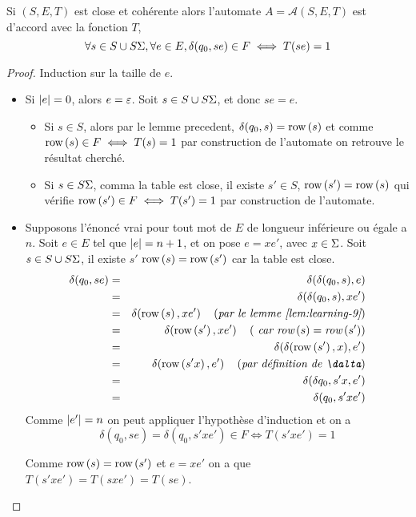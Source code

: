 \begin{lemma}
	Si $(S,E,T)$ est close et cohérente alors l'automate $A = \mathcal A (S,E,T)$
	est d'accord avec la fonction $T$, \ie
	$$\forall s \in S \cup S\Sigma, \forall e \in E, \delta(q_0,se) \in F \iff T(se) =1$$
\end{lemma}

\begin{proof}

	Induction sur la taille de $e$.

	\begin{itemize}
		\item Si $|e| = 0$, alors $e = \varepsilon$.
		      Soit $s \in S \cup S \Sigma$, et donc $se = e$.
		      \begin{itemize}
			      \item Si $s \in S$, alors par le lemme precedent,
			            $\delta(q_0, s) = \text{row}\left(s\right)$ et
			            comme $\text{row}\left(s\right) \in F \iff T(s) = 1$ par construction de l'automate on retrouve le résultat cherché.
			      \item Si $s \in S\Sigma$, comma la table est close, il existe $s' \in S$, \tq $\text{row}\left(s'\right) = \text{row}\left(s\right)$ qui vérifie
			            $\text{row}\left(s'\right) \in F \iff T(s') = 1$ par construction de l'automate.

		      \end{itemize}
		\item Supposons l'énoncé vrai pour tout mot de $E$ de longueur inférieure ou égale a $n$. Soit $e \in E$ tel que $|e| = n + 1$,
		      et on pose $e = x e'$, avec $x \in \Sigma$. Soit $s \in S \cup S\Sigma$, il existe
		      $s'$ \tq $\text{row}\left(s\right) = \text{row}\left(s'\right)$ car la table est close.
		      \begin{eqnarray*}
			      \delta(q_0, se) &=& \delta(\delta(q_0,s),e) \\
			      &=& \delta(\delta(q_0,s),xe') \\
			      &=& \delta(\row s,xe') \reason{par le lemme \ref{lem:learning-9}} \\
			      &=& \delta(\row {s'},xe') \reason{ car $\row s = \row {s'}$} \\
			      &=& \delta(\delta (\row {s'}, x), e') \\
			      &=& \delta(\row {s'x}, e') \reason {par définition de $\dalta$}\\
			      &=& \delta(\delta{q_0, s'x}, e') \\
			      &=& \delta(q_0, s'x e')
		      \end{eqnarray*}
		      Comme $|e'| = n$ on peut appliquer l'hypothèse d'induction et on a
		      $$ \delta(q_0, se) = \delta(q_0, s'x e') \in F \iff T(s'x e') = 1$$

		      Comme $\text{row}\left(s\right) = \text{row}\left(s'\right)$  et $e = xe'$ on a que $T(s'xe') = T(sxe') = T(se)$.
	\end{itemize}
\end{proof}

